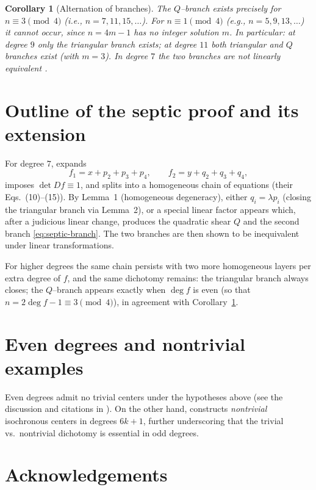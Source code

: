 \documentclass[11pt]{article}%
\theoremstyle{plain}
\newtheorem{corollary}[theorem]{Corollary}
\theoremstyle{definition}
\begin{document}
\begin{corollary}
[Alternation of branches]\label{cor:alternation} The $Q$--branch exists
precisely for $n\equiv3\pmod
4$ (i.e., $n=7,11,15,\dots$). For $n\equiv1\pmod 4$ (e.g., $n=5,9,13,\dots$)
it cannot occur, since $n=4m-1$ has no integer solution $m$. In particular: at
degree $9$ only the triangular branch exists; at degree $11$ both triangular
and $Q$ branches exist (with $m=3$). In degree $7$ the two branches are not
linearly equivalent \cite[Thm.~5]{BraLliMer}.
\end{corollary}

\section{Outline of the septic proof and its extension}

For degree $7$, \cite{BraLliMer} expands
\[
f_{1}=x+p_{2}+p_{3}+p_{4},\qquad f_{2}=y+q_{2}+q_{3}+q_{4},
\]
imposes $\det Df\equiv1$, and splits into a homogeneous chain of equations
(their Eqs.~(10)--(15)). By Lemma~1 (homogeneous degeneracy), either
$q_{i}=\lambda p_{i}$ (closing the triangular branch via Lemma~2), or a
special linear factor appears which, after a judicious linear change, produces
the quadratic shear $Q$ and the second branch \eqref{eq:septic-branch}. The
two branches are then shown to be inequivalent under linear transformations.
\medskip

For higher degrees the same chain persists with two more homogeneous layers
per extra degree of $f$, and the same dichotomy remains: the triangular branch
always closes; the $Q$--branch appears exactly when $\deg f$ is even (so that
$n=2\deg f-1\equiv3\pmod 4$), in agreement with
Corollary~\ref{cor:alternation}.

\section{Even degrees and nontrivial examples}

Even degrees admit no trivial centers under the hypotheses above (see the
discussion and citations in \cite{BraLliMer}). On the other hand,
\cite{BraLliMer} constructs \emph{nontrivial} isochronous centers in degrees
$6k+1 $, further underscoring that the trivial vs.\ nontrivial dichotomy is
essential in odd degrees.

\section*{Acknowledgements}
\end{document}
